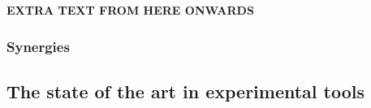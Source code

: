 
\textbf{EXTRA TEXT FROM HERE ONWARDS}


\subsubsection{Synergies}






\subsection{The state of the art in experimental tools}
\smallskip





